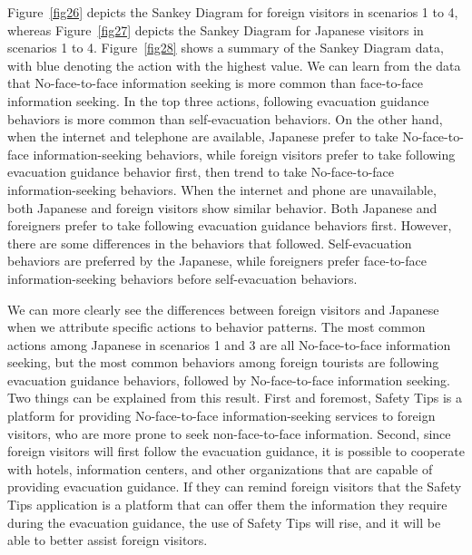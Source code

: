 Figure~\ref{fig26} depicts the Sankey Diagram for foreign visitors in scenarios 1 to 4, whereas Figure~\ref{fig27} depicts the Sankey Diagram for Japanese visitors in scenarios 1 to 4. Figure~\ref{fig28} shows a summary of the Sankey Diagram data, with blue denoting the action with the highest value. We can learn from the data that No-face-to-face information seeking is more common than face-to-face information seeking. In the top three actions, following evacuation guidance behaviors is more common than self-evacuation behaviors. On the other hand, when the internet and telephone are available, Japanese prefer to take No-face-to-face information-seeking behaviors, while foreign visitors prefer to take following evacuation guidance behavior first, then trend to take No-face-to-face information-seeking behaviors. When the internet and phone are unavailable, both Japanese and foreign visitors show similar behavior. Both Japanese and foreigners prefer to take following evacuation guidance behaviors first. However, there are some differences in the behaviors that followed. Self-evacuation behaviors are preferred by the Japanese, while foreigners prefer face-to-face information-seeking behaviors before self-evacuation behaviors.

We can more clearly see the differences between foreign visitors and Japanese when we attribute specific actions to behavior patterns. The most common actions among Japanese in scenarios 1 and 3 are all No-face-to-face information seeking, but the most common behaviors among foreign tourists are following evacuation guidance behaviors, followed by No-face-to-face information seeking. Two things can be explained from this result. First and foremost, Safety Tips is a platform for providing No-face-to-face information-seeking services to foreign visitors, who are more prone to seek non-face-to-face information. Second, since foreign visitors will first follow the evacuation guidance, it is possible to cooperate with hotels, information centers, and other organizations that are capable of providing evacuation guidance. If they can remind foreign visitors that the Safety Tips application is a platform that can offer them the information they require during the evacuation guidance, the use of Safety Tips will rise, and it will be able to better assist foreign visitors.


